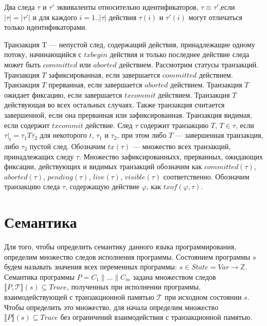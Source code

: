 \begin{mydefinition}\label{def3} Два следа $\tau$ и $\tau'$ эквиваленты относительно идентификаторов, $\tau \equiv \tau'$,если $|\tau| = |\tau'|$ и для каждого $i = 1..|\tau|$ действия $\tau(i)$ и $\tau'(i)$ могут отличаться только идентификаторами.
\end{mydefinition}

Транзакция T --- непустой след, содержащий действия, принадлежащие одному потоку, начинающийся с $txbegin$ действия и только последнее действие следа может быть $committed$ или $aborted$ действием. Рассмотрим статусы транзакций. Транзакция $T$ зафиксированная, если завершается $committed$ действием. Транзакция $T$ прерванная, если завершается $aborted$ действием. Транзакция $T$ ожидает фиксацию, если завершается $txcommit$ действием. Транзакция $T$ действующая во всех остальных случаях. Также транзакция считается завершенной, если она прерванная или зафиксированная. Транзакция видимая, если содержит $txcommit$ действие. След $\tau$ содержит транзакцию $T$, $T \in \tau$, если $\tau|_t = \tau_1T\tau_2$ для некоторого $t$, $\tau_1$ и $\tau_2$, при этом либо $T$ --- завершенная транзакция, либо $\tau_2$ пустой след. Обозначим $tx(\tau)$ --- множество всех транзакций, принадлежащих следу $\tau$. Множество зафиксированныхх, прерванных, ожидающих фиксации, действующих и видимых транзакций обозначим как $committed(\tau)$, $aborted(\tau)$, $pending(\tau)$, $live(\tau)$, $visible(\tau)$ соответственно. Обозначим транзакцию следа $\tau$, содержащую действие $\varphi$, как $txof(\varphi, \tau)$.

\section{Семантика}  
Для того, чтобы определить семантику данного языка программирования, определим множество следов исполнения программы. Состоянием программы $s$ будем называть значения всех переменных программы: $s \in State = Var \to \mathbb{Z} $. Семантика программы $P = C_1 \parallel \ldots \parallel C_m$ задана множеством следов $\llbracket P, \mathcal{T} \rrbracket (s) \subseteq Trace$, полученных при исполнении программы, взаимодействующей с транзакционной памятью $\mathcal{T}$ при исходном состоянии $s$. Чтобы определить это множество, для начала определим множество $\llbracket P \rrbracket (s) \subseteq Trace$ без ограничений взаимодействия с транзакционной памятью.

